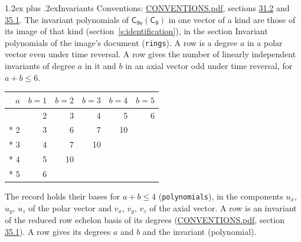 \documentclass[10pt,a4paper]{article}
\makeatletter
\renewcommand\section{\@startsection{section}{1}{\z@}{-3ex plus -1ex minus -.2ex}%
  {1.2ex plus .2ex}{\normalfont\large\sffamily\bfseries\color{parttitle}}}
\numberwithin{equation}{section}
\newcommand{\grp}[1]{\mathsf{#1}}
\makeatother
\begin{document}
\section{Invariants}\label{s:invariants}
Conventions: \href{../../CONVENTIONS.pdf}{CONVENTIONS.pdf}, sections \href{../../CONVENTIONS.pdf\#conv.31.2}{31.2} and \href{../../CONVENTIONS.pdf\#conv.35.1}{35.1}.
The invariant polynomials of $\grp{C_{9v}}(\grp{C_{9}})$ in one vector of a kind are those of its image of that kind (section~\ref{s:identification}), in the section Invariant polynomials of the image's document (\texttt{rings}).
\leavevmode\label{n:index.degree.polar}\label{n:index.degree.axial}A row is a degree $a$ in a polar vector even under time reversal. A row gives the number of linearly independent invariants of degree $a$ in it and $b$ in an axial vector odd under time reversal, for $a + b \le 6$.
{\small\begin{longtable}{@{}rrrrrr@{}}\toprule
$a$ & $b = 1$ & $b = 2$ & $b = 3$ & $b = 4$ & $b = 5$\\\midrule\endhead
\bottomrule\endfoot\endlastfoot
1 & 2 & 3 & 4 & 5 & 6\\*
2 & 3 & 6 & 7 & 10 & \\*
3 & 4 & 7 & 10 &  & \\*
4 & 5 & 10 &  &  & \\*
5 & 6 &  &  &  & \\
\bottomrule\end{longtable}}
\leavevmode\label{n:local.component.polar}\label{n:local.component.axial}The record holds their bases for $a + b \le 4$ (\texttt{polynomials}), in the components $u_{x}$, $u_{y}$, $u_{z}$ of the polar vector and $v_{x}$, $v_{y}$, $v_{z}$ of the axial vector. \label{n:head.polynomial}A row is an invariant of the reduced row echelon basis of its degrees (\href{../../CONVENTIONS.pdf}{CONVENTIONS.pdf}, section \href{../../CONVENTIONS.pdf\#conv.35.1}{35.1}). A row gives its degrees $a$ and $b$ and the invariant (polynomial).
\end{document}
